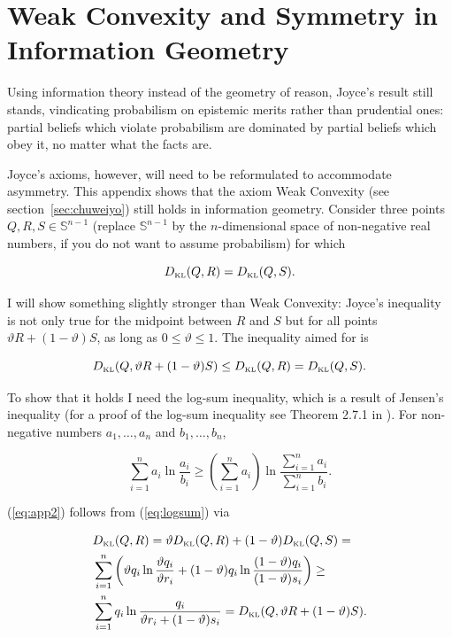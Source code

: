\documentclass[phd,12pt,oneside]{ubcthesis}
\begin{document}
\appendix

\chapter{Weak Convexity and Symmetry in Information Geometry}
\label{app:wcs}

Using information theory instead of the geometry of reason, Joyce's
result still stands, vindicating probabilism on epistemic merits
rather than prudential ones: partial beliefs which violate probabilism
are dominated by partial beliefs which obey it, no matter what the
facts are.

Joyce's axioms, however, will need to be reformulated to accommodate
asymmetry. This appendix shows that the axiom Weak Convexity (see
section~\ref{sec:chuweiyo}) still holds in information geometry. Consider
three points $Q,R,S\in\mathbb{S}^{n-1}$ (replace $\mathbb{S}^{n-1}$ by the
$n$-dimensional space of non-negative real numbers, if you do not want
to assume probabilism) for which

\begin{equation}
  \label{eq:app1}
  D_{\mbox{\tiny KL}}(Q,R)=D_{\mbox{\tiny KL}}(Q,S).
\end{equation}

I will show something slightly stronger than Weak Convexity: Joyce's
inequality is not only true for the midpoint between $R$ and $S$ but
for all points $\vartheta{}R+(1-\vartheta)S$, as long as
$0\leq\vartheta\leq{}1$. The inequality aimed for is

\begin{equation}
  \label{eq:app2}
  D_{\mbox{\tiny KL}}(Q,\vartheta{}R+(1-\vartheta)S)\leq{}D_{\mbox{\tiny KL}}(Q,R)=D_{\mbox{\tiny KL}}(Q,S).
\end{equation}

{\noindent}To show that it holds I need the log-sum inequality, which is a result
of Jensen's inequality (for a proof of the log-sum inequality see
Theorem 2.7.1 in ). For non-negative
numbers $a_{1},\ldots,a_{n}$ and $b_{1},\ldots,b_{n}$,

\begin{equation}
  \label{eq:logsum}
  \sum_{i=1}^{n}a_{i}\ln\frac{a_{i}}{b_{i}}\geq\left(\sum_{i=1}^{n}a_{i}\right)\ln\frac{\sum_{i=1}^{n}a_{i}}{\sum_{i=1}^{n}b_{i}}.
\end{equation}

{\noindent}(\ref{eq:app2}) follows from (\ref{eq:logsum}) via

\begin{align}
  \label{eq:app3}
  &D_{\mbox{\tiny KL}}(Q,R)=\vartheta{}D_{\mbox{\tiny KL}}(Q,R)+(1-\vartheta)D_{\mbox{\tiny KL}}(Q,S)=\notag \\
  &\sum_{i=1}^{n}\left(\vartheta{}q_{i}\ln\frac{\vartheta{}q_{i}}{\vartheta{}r_{i}}+(1-\vartheta)q_{i}\ln\frac{(1-\vartheta)q_{i}}{(1-\vartheta)s_{i}}\right)\geq\notag \\
  &\sum_{i=1}^{n}q_{i}\ln\frac{q_{i}}{\vartheta{}r_{i}+(1-\vartheta)s_{i}}=D_{\mbox{\tiny KL}}(Q,\vartheta{}R+(1-\vartheta)S).
\end{align}
\end{document}
